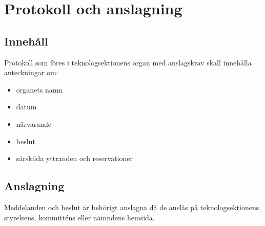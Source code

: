 \section{Protokoll och anslagning}

\subsection{Innehåll}
Protokoll som föres i teknologsektionens organ med anslagskrav skall innehålla anteckningar om:
\begin{itemize}
    \item organets namn
    \item datum
    \item närvarande
	\item beslut
	\item särskilda yttranden och reservationer
\end{itemize}

\subsection{Anslagning}
\label{sec:protokoll:anslagning}
Meddelanden och beslut är behörigt anslagna då de anslås på teknologsektionens, styrelsens, kommitténs eller nämndens hemsida.